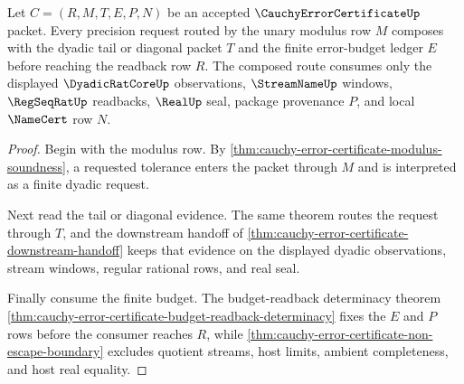 \begin{theorem}
\label{thm:cauchy-error-certificate-modulus-budget-composition}
Let $C=(R,M,T,E,P,N)$ be an accepted $\CauchyErrorCertificateUp$ packet. Every precision request routed by the unary modulus row $M$ composes with the dyadic tail or diagonal packet $T$ and the finite error-budget ledger $E$ before reaching the readback row $R$. The composed route consumes only the displayed $\DyadicRatCoreUp$ observations, $\StreamNameUp$ windows, $\RegSeqRatUp$ readbacks, $\RealUp$ seal, package provenance $P$, and local $\NameCert$ row $N$.
\end{theorem}
\begin{proof}
Begin with the modulus row. By \autoref{thm:cauchy-error-certificate-modulus-soundness}, a requested tolerance enters the packet through $M$ and is interpreted as a finite dyadic request.

Next read the tail or diagonal evidence. The same theorem routes the request through $T$, and the downstream handoff of \autoref{thm:cauchy-error-certificate-downstream-handoff} keeps that evidence on the displayed dyadic observations, stream windows, regular rational rows, and real seal.

Finally consume the finite budget. The budget-readback determinacy theorem \autoref{thm:cauchy-error-certificate-budget-readback-determinacy} fixes the $E$ and $P$ rows before the consumer reaches $R$, while \autoref{thm:cauchy-error-certificate-non-escape-boundary} excludes quotient streams, host limits, ambient completeness, and host real equality.
\end{proof}

